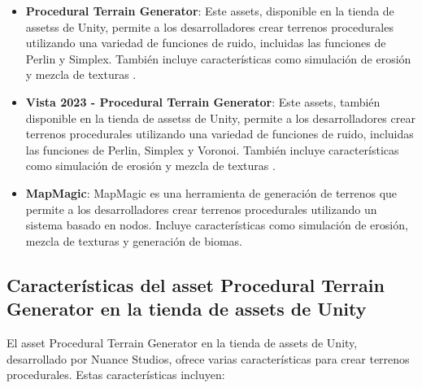 \begin{itemize}
    \item \textbf{Procedural Terrain Generator}: Este assets, disponible en la tienda de assetss de Unity, permite a los desarrolladores crear terrenos procedurales utilizando una variedad de funciones de ruido, incluidas las funciones de Perlin y Simplex. También incluye características como simulación de erosión y mezcla de texturas \cite{ProceduralTerrainGenerator}.
    
    \item \textbf{Vista 2023 - Procedural Terrain Generator}: Este assets, también disponible en la tienda de assetss de Unity, permite a los desarrolladores crear terrenos procedurales utilizando una variedad de funciones de ruido, incluidas las funciones de Perlin, Simplex y Voronoi. También incluye características como simulación de erosión y mezcla de texturas \cite{Vista2023TerrainGenerator}.
    
    \item \textbf{MapMagic}: MapMagic es una herramienta de generación de terrenos que permite a los desarrolladores crear terrenos procedurales utilizando un sistema basado en nodos. Incluye características como simulación de erosión, mezcla de texturas y generación de biomas\cite{MapMagicTerrain}.
    
\end{itemize}

\subsection{Características del asset Procedural Terrain Generator en la tienda de assets de Unity}

El asset Procedural Terrain Generator en la tienda de assets de Unity, desarrollado por Nuance Studios, ofrece varias características para crear terrenos procedurales. Estas características incluyen:

